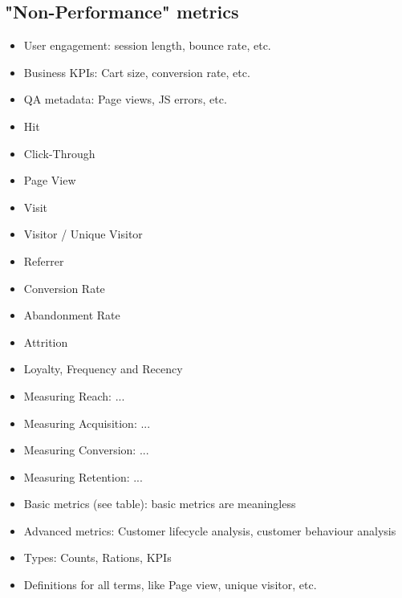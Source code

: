 






\subsection{"Non-Performance" metrics}

\begin{itemize}
\item User engagement: session length, bounce rate, etc.
\item Business KPIs: Cart size, conversion rate, etc.
\item QA metadata: Page views, JS errors, etc.
\end{itemize}



\begin{itemize}
\item Hit
\item Click-Through
\item Page View
\item Visit
\item Visitor / Unique Visitor
\item Referrer
\item Conversion Rate
\item Abandonment Rate
\item Attrition
\item Loyalty, Frequency and Recency
\item Measuring Reach: ...
\item Measuring Acquisition: ...
\item Measuring Conversion: ...
\item Measuring Retention: ...
\end{itemize}


\begin{itemize}
\item Basic metrics (see table): basic metrics are meaningless
\item Advanced metrics: Customer lifecycle analysis, customer behaviour analysis
\end{itemize}


\begin{itemize}
\item Types: Counts, Rations, KPIs
\item Definitions for all terms, like Page view, unique visitor, etc.
\end{itemize}




